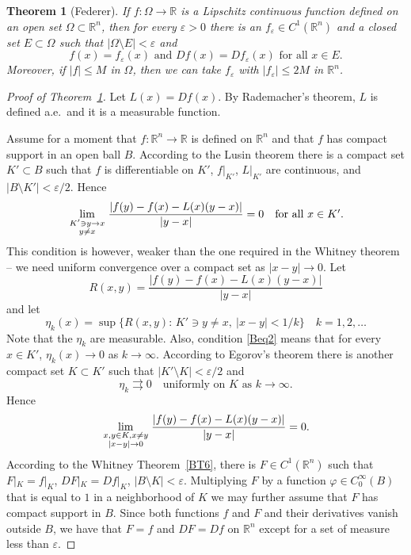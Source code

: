 \documentclass[10pt,a4paper]{amsart}
\newtheorem{theorem}{Theorem}
\newcommand{\bbbr}{\mathbb R}
\newcommand{\eps}{\varepsilon}
\begin{document}
\begin{theorem}[Federer]
\label{BT5}
If $f:\Omega\to\bbbr$ is a Lipschitz continuous function defined on an open set $\Omega\subset\bbbr^n$, then for every $\eps>0$ there is an $f_\eps\in C^1(\bbbr^n)$
and a closed set $E\subset\Omega$ such that $|\Omega\setminus E|<\eps$ and
$$
f(x)=f_\eps(x)\text{ and } Df(x)= Df_\eps(x) \text{ for all } x\in E.
$$
Moreover, if $|f|\leq M$ in $\Omega$, then we can take $f_\eps$ with $|f_\eps|\leq 2M$ in $\bbbr^n$.
\end{theorem}

\begin{proof}[Proof of Theorem~\ref{BT5}]
Let $L(x)=Df(x)$. By Rademacher's theorem, $L$ is defined a.e.\ and it is a measurable function.

Assume for a moment that $f:\bbbr^n\to\bbbr$ is defined on $\bbbr^n$ and that $f$ has compact support in an open ball $B$. According to the Lusin theorem there is a compact set $K'\subset B$ such that
$f$ is differentiable on $K'$,
$f|_{K'}$, $L|_{K'}$ are continuous, and $|B\setminus K'|<\eps/2$. Hence
\begin{equation}
\label{Beq2}
\lim_{{\scriptstyle K'\ni y\to x}\atop {\scriptstyle y\neq x}}
\frac{|f(y)-f(x)-L(x)(y-x)|}{|y-x|} =0
\quad
\mbox{for all $x\in K'$.}
\end{equation}
This condition is however, weaker than the one required in the Whitney theorem -- we need uniform
convergence over a compact set as $|x-y|\to 0$. Let
$$
R(x,y)=\frac{|f(y)-f(x)-L(x)(y-x)|}{|y-x|}
$$
and let
$$
\eta_k(x) = \sup\{R(x,y):\, K'\ni y\neq x,\ |x-y|<1/k\}
\quad
k=1,2,\ldots
$$
Note that the $\eta_k$ are measurable. Also, condition \eqref{Beq2} means that for every $x\in K'$,
$\eta_k(x)\to 0$ as $k\to\infty$.  According to Egorov's theorem
there is another compact set $K\subset K'$ such that $|K'\setminus K|<\eps/2$
and
$$
\eta_k\rightrightarrows 0
\quad
\text{uniformly on $K$ as $k\to\infty$.}
$$
Hence
$$
\lim_{{\scriptstyle x,y\in K, x\neq y}\atop {\scriptstyle |x-y|\to 0}}
\frac{|f(y)-f(x)-L(x)(y-x)|}{|y-x|} =0.
$$
According to the Whitney Theorem~\ref{BT6}, there is $F\in C^1(\bbbr^n)$ such that $F|_K=f|_K$,
$DF|_K=Df|_K$, $|B\setminus K|<\eps$. Multiplying $F$ by a function $\varphi\in C_0^\infty(B)$ that is equal to $1$ in a neighborhood of $K$
we may further assume that $F$ has compact support in $B$. Since both functions $f$ and  $F$ and their derivatives
vanish outside $B$, we have that $F=f$ and $DF=Df$ on $\bbbr^n$ except for a set of measure less than $\eps$.


\end{proof}
\end{document}
